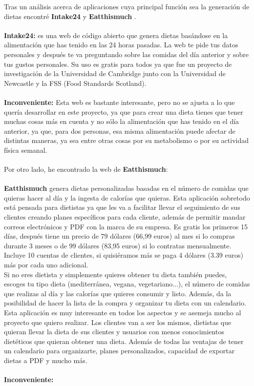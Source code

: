 Tras un análisis acerca de aplicaciones cuya principal función sea la generación de dietas encontré \textbf{Intake24} \cite{Intake24} y \textbf{Eatthismuch} \cite{Eatthismuch}. 
\\\\
\textbf{Intake24:} es una web de código abierto que genera dietas basándose en la alimentación que has tenido en las 24 horas pasadas.
La web te pide tus datos personales y después te va preguntando sobre las comidas del día anterior y sobre tus gustos personales.
Su uso es gratis para todos ya que fue un proyecto de investigación de la Universidad de Cambridge junto con la Universidad de Newcastle y 
la FSS (Food Standards Scotland).
\\\\
\textbf{Inconveniente:}
Esta web es bastante interesante, pero no se ajusta a lo que quería desarrollar en este proyecto, ya que para crear una dieta tienes que tener muchas cosas más en cuenta y no sólo
la alimentación que has tenido en el día anterior, ya que, para dos personas, esa misma alimentación puede afectar de distintas maneras,
ya sea entre otras cosas por su metabolismo o por su actividad física semanal.
\\\\
Por otro lado, he encontrado la web de \textbf{Eatthismuch}:
\\\\
\textbf{Eatthismuch} genera dietas personalizadas basadas en el número de comidas que quieras hacer al día y la ingesta de calorías que quieras.
Esta aplicación sobretodo está pensada para dietistas ya que les va a facilitar llevar el seguimiento de sus clientes creando planes específicos
para cada cliente, además de permitir mandar correos electrónicos y PDF con la marca de su empresa.
Es gratis los primeros 15 días, después tiene un precio de 79 dólares (66,99 euros) al mes si lo compras durante 3 meses o de 99 dólares (83,95 euros) si lo contratas mensualmente.
Incluye 10 cuentas de clientes, si quisiéramos más se paga 4 dólares (3.39 euros) más por cada uno adicional.\\
Si no eres dietista y simplemente quieres obtener tu dieta también puedes, escoges tu tipo dieta (mediterránea, vegana, vegetariano...), el número de comidas que realizas al día y las calorías que quieres consumir y listo.
Además, da la posibilidad de hacer la lista de la compra y organizar tu dieta con un calendario.
Esta aplicación es muy interesante en todos los aspectos y se asemeja mucho al proyecto que quiero realizar. Los clientes van a ser los mismos, dietistas que quieran llevar la dieta de sus clientes
y usuarios con menos conocimientos dietéticos que quieran obtener una dieta. Además de todas las ventajas de tener un calendario para organizarte, planes personalizados, capacidad de exportar dietas a PDF y mucho más.
\\\\
\textbf{Inconveniente:}

